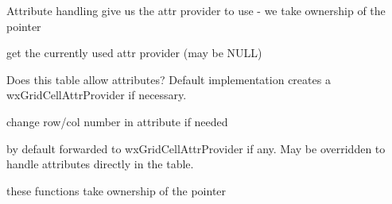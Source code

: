 \label{wxgridtablebasesetcollabelvalue}



\label{wxgridtablebasesetattrprovider}


Attribute handling
give us the attr provider to use - we take ownership of the pointer


\label{wxgridtablebasegetattrprovider}


get the currently used attr provider (may be NULL)


\label{wxgridtablebasecanhaveattributes}


Does this table allow attributes?  Default implementation creates
a wxGridCellAttrProvider if necessary.


\label{wxgridtablebaseupdateattrrows}


change row/col number in attribute if needed


\label{wxgridtablebaseupdateattrcols}



\label{wxgridtablebasegetattr}


by default forwarded to wxGridCellAttrProvider if any. May be
overridden to handle attributes directly in the table.


\label{wxgridtablebasesetattr}


these functions take ownership of the pointer


\label{wxgridtablebasesetrowattr}



\label{wxgridtablebasesetcolattr}


